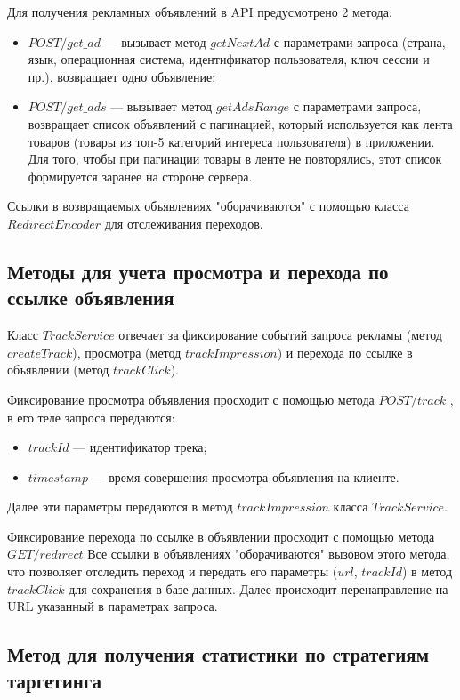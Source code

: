 \documentclass[specification,annotation,times]{itmo-student-thesis}
\begin{document}

Для получения рекламных объявлений в API предусмотрено 2 метода:
\begin{itemize}
\item $POST /get\_ad $ —  вызывает метод $getNextAd$ с параметрами запроса (страна, язык, операционная система, идентификатор пользователя, ключ сессии и пр.), возвращает одно объявление;
\item $POST /get\_ads $  — вызывает метод $getAdsRange$ с параметрами запроса, возвращает список объявлений с пагинацией, который используется как лента товаров (товары из топ-5 категорий интереса пользователя) в приложении. Для того, чтобы при пагинации товары в ленте не повторялись, этот список формируется заранее на стороне сервера. 
\end{itemize}
Ссылки в возвращаемых объявлениях "оборачиваются" с помощью класса $RedirectEncoder$  для отслеживания переходов.


\subsection{Методы для учета просмотра и перехода по ссылке объявления}

Класс $TrackService$ отвечает за фиксирование событий запроса рекламы (метод $createTrack$), просмотра (метод $trackImpression$) и перехода по ссылке в объявлении (метод $trackClick$).

Фиксирование просмотра объявления просходит с помощью метода $POST /track$ , в его теле запроса передаются:
\begin{itemize}
\item $trackId$ — идентификатор трека;
\item $timestamp$ — время совершения просмотра объявления на клиенте.
\end{itemize}
Далее эти параметры передаются в метод $trackImpression$ класса $TrackService$.

Фиксирование перехода по ссылке в объявлении просходит с помощью метода $GET /redirect$ Все ссылки в объявлениях "оборачиваются" вызовом этого метода, что позволяет отследить переход и передать его параметры ($url$, $trackId$) в метод $trackClick$  для сохранения в базе данных. Далее происходит перенаправление на URL указанный в параметрах запроса.

\subsection{Метод для получения статистики по стратегиям таргетинга}
\end{document}

